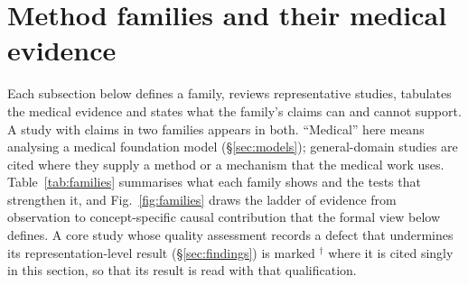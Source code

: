 \section{Method families and their medical evidence}
\label{sec:methods}

Each subsection below defines a family, reviews representative studies, tabulates the medical evidence
and states what the family's claims can and cannot support. A study with claims in two families appears
in both. ``Medical'' here means analysing a medical foundation model (\S\ref{sec:models}); general-domain
studies are cited where they supply a method or a mechanism that the medical work uses.
Table~\ref{tab:families} summarises what each family shows and the tests that strengthen it, and
Fig.~\ref{fig:families} draws the ladder of evidence from observation to concept-specific causal
contribution that the formal view below defines. A core study whose quality assessment records a defect
that undermines its representation-level result (\S\ref{sec:findings}) is marked $^{\dagger}$ where it is
cited singly in this section, so that its result is read with that qualification.

